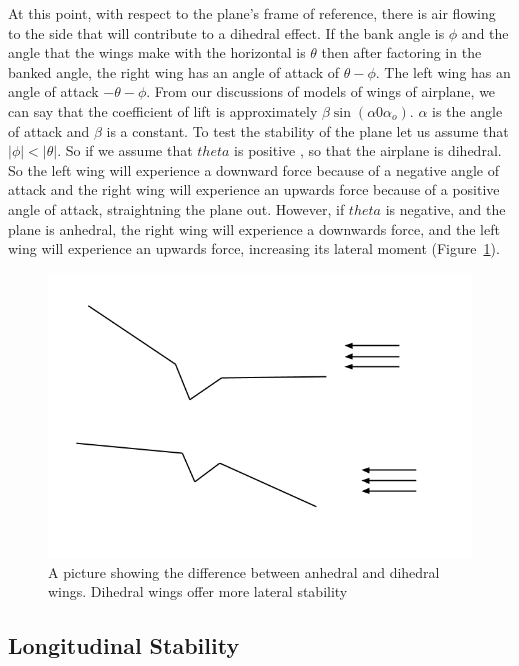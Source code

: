 At this point, with respect to the plane's frame of reference, there is air flowing 
to the side that will contribute to a dihedral effect. 
If the bank angle is $\phi$ and
the angle that the wings make with the horizontal is $\theta$ then after factoring in
the banked angle, the right wing has an angle of attack of  $\theta - \phi$.
The left wing has an angle of attack $- \theta - \phi$.
From our discussions of models of wings of airplane, we can say that the
coefficient of lift is approximately $\beta \sin(\alpha 0 \alpha_o)$.
$\alpha$ is the angle of attack and $\beta$ is a constant. To test the stability of the plane
let us assume that $|\phi| < |\theta|$.
So if we assume that $theta$ is positive , so that the airplane is dihedral.
So the left wing will experience a downward force because of a negative angle of attack
and the right wing will experience an upwards force because of a positive angle of attack, straightning the plane out.
However, if $theta$ is negative, and the plane is anhedral, the right wing will experience a
downwards force, and the left wing will experience an upwards force, increasing its lateral moment
(Figure~\ref{fig:dihedral2}). 


\begin{figure}[hl]
  \centering
    \includegraphics[scale=.5]{figures/dihedral2.png}
    \caption{A picture showing the difference between anhedral and dihedral wings. Dihedral wings offer 
    more lateral stability}
  \label{fig:dihedral2}
\end{figure}


\subsection{Longitudinal Stability}
\label{sec:long_stability}

